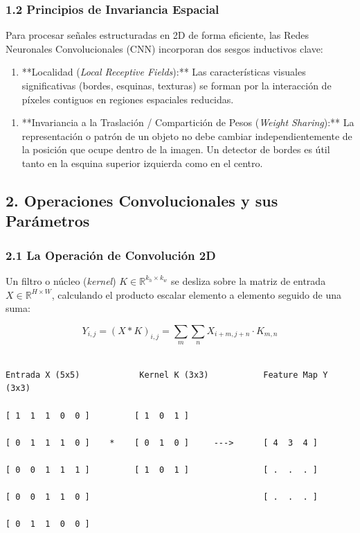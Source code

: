 \documentclass[11pt,oneside]{article}
\begin{document}
\subsubsection{1.2 Principios de Invariancia Espacial}

Para procesar señales estructuradas en 2D de forma eficiente, las Redes Neuronales Convolucionales (CNN) incorporan dos sesgos inductivos clave:

\begin{enumerate}

\item **Localidad (\emph{Local Receptive Fields}):** Las características visuales significativas (bordes, esquinas, texturas) se forman por la interacción de píxeles contiguos en regiones espaciales reducidas.

\end{enumerate}

\begin{enumerate}

\item **Invariancia a la Traslación / Compartición de Pesos (\emph{Weight Sharing}):** La representación o patrón de un objeto no debe cambiar independientemente de la posición que ocupe dentro de la imagen. Un detector de bordes es útil tanto en la esquina superior izquierda como en el centro.

\end{enumerate}

\subsection{2. Operaciones Convolucionales y sus Parámetros}

\subsubsection{2.1 La Operación de Convolución 2D}

Un filtro o núcleo (\emph{kernel}) \(K \in \mathbb{R}^{k_h \times k_w}\) se desliza sobre la matriz de entrada \(X \in \mathbb{R}^{H \times W}\), calculando el producto escalar elemento a elemento seguido de una suma:

\[Y_{i, j} = (X * K)_{i, j} = \sum_{m} \sum_{n} X_{i+m, j+n} \cdot K_{m, n}\]

\begin{lstlisting}

Entrada X (5x5)            Kernel K (3x3)           Feature Map Y (3x3)

[ 1  1  1  0  0 ]         [ 1  0  1 ]

[ 0  1  1  1  0 ]    *    [ 0  1  0 ]     --->      [ 4  3  4 ]

[ 0  0  1  1  1 ]         [ 1  0  1 ]               [ .  .  . ]

[ 0  0  1  1  0 ]                                   [ .  .  . ]

[ 0  1  1  0  0 ]



\end{lstlisting}
\end{document}
